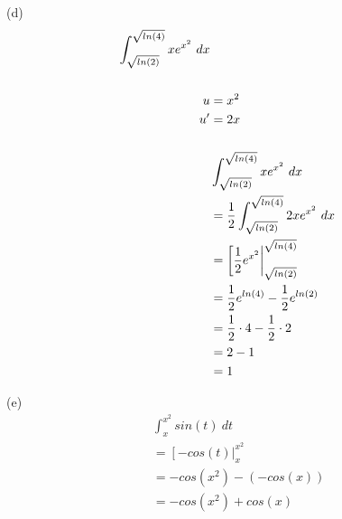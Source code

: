 \begin{exercise}
    (d)
    \begin{align}
        \int_{\sqrt{ln(2)}}^{\sqrt{ln(4)}} xe^{x^2} \ dx                        \\
        \\
        u  & = x^2                                                              \\
        u' & = 2x                                                               \\
        \\
           & \int_{\sqrt{ln(2)}}^{\sqrt{ln(4)}} xe^{x^2} \ dx                   \\
           & = {1 \over 2} \int_{\sqrt{ln(2)}}^{\sqrt{ln(4)}} 2xe^{x^2} \ dx    \\
           & = \left[ {1 \over 2} e^{x^2} \right|_{\sqrt{ln(2)}}^{\sqrt{ln(4)}} \\
           & = {1 \over 2}e^{ln(4)} - {1 \over 2}e^{ln(2)}                      \\
           & = {1 \over 2} \cdot 4 - {1 \over 2} \cdot 2                        \\
           & = 2 - 1                                                            \\
           & = 1                                                                \\
    \end{align}

    (e)
    \begin{align}
         & \int_x^{x^2} sin(t) \ dt         \\
         & = \left[ -cos(t) \right|_x^{x^2} \\
         & = -cos(x^2) - (-cos(x))          \\
         & = -cos(x^2) + cos(x)             \\
    \end{align}


\end{exercise}
